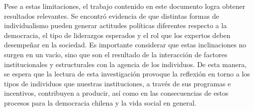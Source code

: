 \documentclass[12pt,twoside]{templates/facsothesis}
\begin{document}
Pese a estas limitaciones, el trabajo contenido en este documento logra obtener resultados relevantes. Se encontró evidencia de que distintas formas de individualismo pueden generar actitudes políticas diferentes respecto a la democracia, el tipo de liderazgos esperados y el rol que los expertos deben desempeñar en la sociedad. Es importante considerar que estas inclinaciones no surgen en un vacío, sino que son el resultado de la interacción de factores institucionales y estructurales con la agencia de los individuos. De esta manera, se espera que la lectura de esta investigación provoque la reflexión en torno a los tipos de individuos que nuestras instituciones, a través de sus programas e incentivos, contribuyen a producir, así como en las consecuencias de estos procesos para la democracia chilena y la vida social en general.


\cleardoublepage
\pagestyle{fancyplain}
\fancyhf{}
{}


\end{document}
